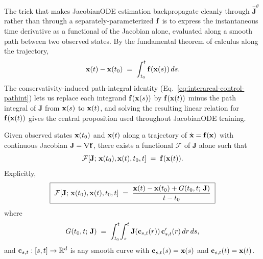 The trick that makes JacobianODE estimation backpropagate cleanly through $\hat{\mathbf{J}}^\theta$ rather than through a separately-parameterized $\vb{f}$ is to express the instantaneous time derivative as a functional of the Jacobian alone, evaluated along a smooth path between two observed states. By the fundamental theorem of calculus along the trajectory,
\begin{equation}
\vb{x}(t)-\vb{x}(t_0) \;=\; \int_{t_0}^{t}\vb{f}(\vb{x}(s))\,ds.
\end{equation}
The conservativity-induced path-integral identity (Eq.~\ref{eq:interareal-control-pathint}) lets us replace each integrand $\vb{f}(\vb{x}(s))$ by $\vb{f}(\vb{x}(t))$ minus the path integral of $\mathbf{J}$ from $\vb{x}(s)$ to $\vb{x}(t)$, and solving the resulting linear relation for $\vb{f}(\vb{x}(t))$ gives the central proposition used throughout JacobianODE training.

\begin{proposition}\label{prop:supp-interareal-control-Fjac}
Given observed states $\vb{x}(t_0)$ and $\vb{x}(t)$ along a trajectory of $\dot{\vb{x}}=\vb{f}(\vb{x})$ with continuous Jacobian $\mathbf{J}=\nabla\vb{f}$, there exists a functional $\mathcal{F}$ of $\mathbf{J}$ alone such that
\begin{equation}
\mathcal{F}\!\left[\mathbf{J};\,\vb{x}(t_0),\vb{x}(t),t_0,t\right] \;=\; \vb{f}(\vb{x}(t)).
\end{equation}
Explicitly,
\begin{equation}
\boxed{\;\mathcal{F}\!\left[\mathbf{J};\,\vb{x}(t_0),\vb{x}(t),t_0,t\right] \;=\; \frac{\vb{x}(t)-\vb{x}(t_0)+G(t_0,t;\,\mathbf{J})}{t-t_0}\;}\label{eq:supp-interareal-control-Fjac}
\end{equation}
where
\begin{equation}
G(t_0,t;\,\mathbf{J}) \;=\; \int_{t_0}^{t}\!\int_{s}^{t} \mathbf{J}(\vb{c}_{s,t}(r))\,\vb{c}_{s,t}'(r)\,dr\,ds,\label{eq:supp-interareal-control-G}
\end{equation}
and $\vb{c}_{s,t}:[s,t]\to\mathbb{R}^{d}$ is any smooth curve with $\vb{c}_{s,t}(s)=\vb{x}(s)$ and $\vb{c}_{s,t}(t)=\vb{x}(t)$.
\end{proposition}

